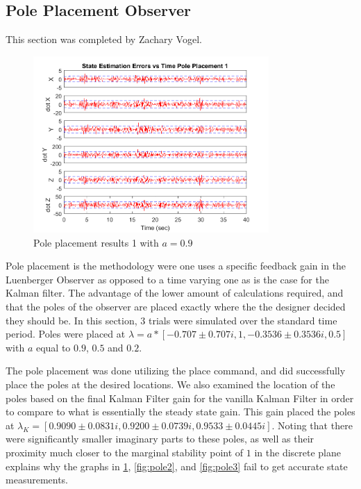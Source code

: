 \documentclass[12pt]{extarticle}
\begin{document}
{\subsection{Pole Placement Observer}{
This section was completed by Zachary Vogel.
\begin{figure}[h!]
    \centering
    \includegraphics[width=0.8\textwidth,clip=true,trim={0cm 0 0cm 0}]{Images/pole1}
    \caption{Pole placement results 1 with $a=0.9$}\label{fig:pole1}
\end{figure}

Pole placement is the methodology were one uses a specific feedback gain in the Luenberger Observer as opposed to a time varying one as is the case for the Kalman filter. The advantage of the lower amount of calculations required, and that the poles of the observer are placed exactly where the the designer decided they should be. In this section, 3 trials were simulated over the standard time period. Poles were placed at $\lambda=a*[-0.707\pm 0.707i, 1,-0.3536\pm 0.3536i,0.5]$ with $a$ equal to $0.9$, $0.5$ and $0.2$.

The pole placement was done utilizing the place command, and did successfully place the poles at the desired locations. We also examined the location of the poles based on the final Kalman Filter gain for the vanilla Kalman Filter in order to compare to what is essentially the steady state gain. This gain placed the poles at $\lambda_{K}=[0.9090 \pm 0.0831i, 0.9200 \pm 0.0739i, 0.9533 \pm 0.0445i]$. Noting that there were significantly smaller imaginary parts to these poles, as well as their proximity much closer to the marginal stability point of $1$ in the discrete plane explains why the graphs in \ref{fig:pole1}, \ref{fig:pole2}, and \ref{fig:pole3} fail to get accurate state measurements.

}}
\end{document}
